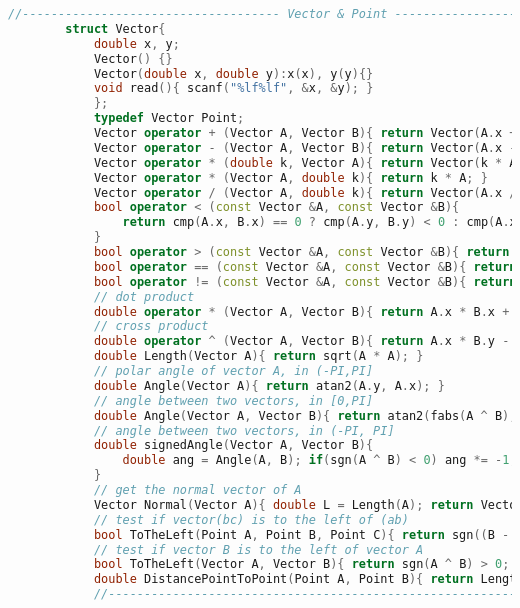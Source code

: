 \documentclass[withoutpreface,bwprint,fontset=macnew]{cumcmthesis} %
\begin{document}
\begin{appendices}
\begin{lstlisting}[language=c++]
		//------------------------------------ Vector & Point ------------------------------------//
		struct Vector{
			double x, y;
			Vector() {}
			Vector(double x, double y):x(x), y(y){}
			void read(){ scanf("%lf%lf", &x, &y); }
			};
			typedef Vector Point;
			Vector operator + (Vector A, Vector B){ return Vector(A.x + B.x, A.y + B.y); }
			Vector operator - (Vector A, Vector B){ return Vector(A.x - B.x, A.y - B.y); }
			Vector operator * (double k, Vector A){ return Vector(k * A.x, k * A.y); }
			Vector operator * (Vector A, double k){ return k * A; }
			Vector operator / (Vector A, double k){ return Vector(A.x / k, A.y / k); }
			bool operator < (const Vector &A, const Vector &B){
				return cmp(A.x, B.x) == 0 ? cmp(A.y, B.y) < 0 : cmp(A.x, B.x) < 0;
			}
			bool operator > (const Vector &A, const Vector &B){ return B < A; }
			bool operator == (const Vector &A, const Vector &B){ return (cmp(A.x, B.x) == 0) && (cmp(A.y, B.y) == 0); }
			bool operator != (const Vector &A, const Vector &B){ return !(A == B); }
			// dot product
			double operator * (Vector A, Vector B){ return A.x * B.x + A.y * B.y; }
			// cross product
			double operator ^ (Vector A, Vector B){ return A.x * B.y - A.y * B.x; }
			double Length(Vector A){ return sqrt(A * A); }
			// polar angle of vector A, in (-PI,PI]
			double Angle(Vector A){ return atan2(A.y, A.x); }
			// angle between two vectors, in [0,PI]
			double Angle(Vector A, Vector B){ return atan2(fabs(A ^ B), A * B); }
			// angle between two vectors, in (-PI, PI]
			double signedAngle(Vector A, Vector B){
				double ang = Angle(A, B); if(sgn(A ^ B) < 0) ang *= -1; return ang;
			}
			// get the normal vector of A
			Vector Normal(Vector A){ double L = Length(A); return Vector(-A.y/L, A.x/L); }
			// test if vector(bc) is to the left of (ab)
			bool ToTheLeft(Point A, Point B, Point C){ return sgn((B - A) ^ (C - B)) > 0; }
			// test if vector B is to the left of vector A
			bool ToTheLeft(Vector A, Vector B){ return sgn(A ^ B) > 0; }
			double DistancePointToPoint(Point A, Point B){ return Length(A-B); }
			//------------------------------------------------------------------------------//
			

\end{lstlisting}
\end{appendices}
\end{document}
